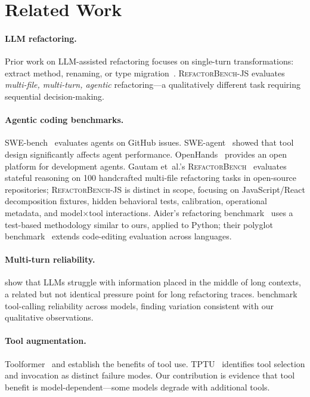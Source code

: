 \documentclass[11pt,letterpaper]{article}
\begin{document}
\section{Related Work}

\paragraph{LLM refactoring.} Prior work on LLM-assisted refactoring focuses on single-turn transformations: extract method, renaming, or type migration~\citep{shirafuji2023refactoring,pomian2024together}. \textsc{RefactorBench}-JS evaluates \emph{multi-file, multi-turn, agentic} refactoring---a qualitatively different task requiring sequential decision-making.

\paragraph{Agentic coding benchmarks.} SWE-bench~\citep{jimenez2024swebench} evaluates agents on GitHub issues. SWE-agent~\citep{yang2024sweagent} showed that tool design significantly affects agent performance. OpenHands~\citep{wang2024openhands} provides an open platform for development agents. Gautam et~al.'s \textsc{RefactorBench}~\citep{gautam2025refactorbench} evaluates stateful reasoning on 100 handcrafted multi-file refactoring tasks in open-source repositories; \textsc{RefactorBench}-JS is distinct in scope, focusing on JavaScript/React decomposition fixtures, hidden behavioral tests, calibration, operational metadata, and model$\times$tool interactions. Aider's refactoring benchmark~\citep{gauthier2024aider} uses a test-based methodology similar to ours, applied to Python; their polyglot benchmark~\citep{gauthier2024polyglot} extends code-editing evaluation across languages.

\paragraph{Multi-turn reliability.} \citet{liu2024lost} show that LLMs struggle with information placed in the middle of long contexts, a related but not identical pressure point for long refactoring traces. \citet{chen2024benchmarking} benchmark tool-calling reliability across models, finding variation consistent with our qualitative observations.

\paragraph{Tool augmentation.} Toolformer~\citep{schick2023toolformer} and \citet{qin2023tool} establish the benefits of tool use. TPTU~\citep{ruan2024tptu} identifies tool selection and invocation as distinct failure modes. Our contribution is evidence that tool benefit is model-dependent---some models degrade with additional tools.
\end{document}
